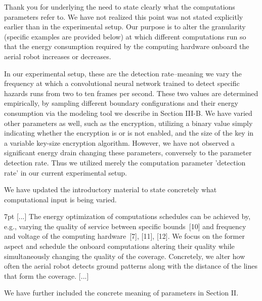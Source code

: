 \documentclass[10pt]{letter}
\newenvironment{formal}{%
  \def\FrameCommand{%
    \hspace{1pt}%
    {\color{red}\vrule width 2pt}%
    {\color{formalshade}\vrule width 4pt}%
    \colorbox{formalshade}%
  }%
  \MakeFramed{\advance\hsize-\width\FrameRestore}%
  \noindent\hspace{-4.55pt}%
  \begin{adjustwidth}{}{7pt}%
  \vspace{2pt}\vspace{2pt}%
}
{%
  \vspace{2pt}\end{adjustwidth}\endMakeFramed%
}
\begin{document}
  {\color{blue} 
  
  {\hspace*{-4.5em}{[R2:3]}\vspace*{-1.9em}}
  
  Thank you for underlying the need to state clearly what the computations parameters refer to. We have not realized this point was not stated explicitly earlier than in the experimental setup. Our purpose is to alter the granularity (specific examples are provided below) at which different computations run so that the energy consumption required by the computing hardware onboard the aerial robot increases or decreases.

  In our experimental setup, these are the detection rate--meaning we vary the frequency at which a convolutional neural network trained to detect specific hazards runs from two to ten frames per second. These two values are determined empirically, by sampling different boundary configurations and their energy consumption via the modeling tool we describe in Section III-B. We have varied other parameters as well, such as the encryption, utilizing a binary value simply indicating whether the encryption is or is not enabled, and the size of the key in a variable key-size encryption algorithm. However, we have not observed a significant energy drain changing these parameters, conversely to the parameter detection rate. Thus we utilized merely the computation parameter 'detection rate' in our current experimental setup. 

  We have updated the introductory material to state concretely what computational input is being varied.

  \begin{formal}\color{black}
    [...] The energy optimization of computations schedules can be achieved by, e.g., varying the quality of service between specific bounds~[{\color{green}10}] and frequency and voltage of the computing hardware~[{\color{green}7}], [{\color{green}11}], [{\color{green}12}]. We focus on the former aspect and schedule the onboard computations altering their quality while simultaneously changing the quality of the coverage.
    {\color{blue} Concretely, we alter how often the aerial robot detects ground patterns along with the distance of the lines that form the coverage.} [...]
    \vspace*{1ex}
  \end{formal}

  We have further included the concrete meaning of parameters in Section II.

}
\end{document}
